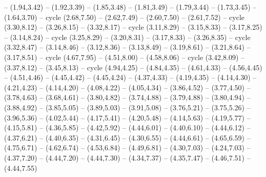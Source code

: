{-- (1.94,3.42) -- (1.92,3.39) -- (1.85,3.48) -- (1.81,3.49) -- (1.79,3.44) -- (1.73,3.45) -- (1.64,3.70) -- cycle
  (2.68,7.50) -- (2.62,7.49) -- (2.60,7.50) -- (2.61,7.52) -- cycle
  (3.30,8.12) -- (3.26,8.15) -- (3.32,8.17) -- cycle
  (3.11,8.29) -- (3.15,8.33) -- (3.17,8.25) -- (3.14,8.24) -- cycle
  (3.25,8.29) -- (3.20,8.31) -- (3.17,8.33) -- (3.26,8.35) -- cycle
  (3.32,8.47) -- (3.14,8.46) -- (3.12,8.36) -- (3.13,8.49) -- (3.19,8.61) -- (3.21,8.64) -- (3.17,8.51) -- cycle
  (4.67,7.95) -- (4.51,8.00) -- (4.58,8.06) -- cycle
  (3.42,8.09) -- (3.37,8.12) -- (3.45,8.13) -- cycle}
\expandafter\def\csname geo:Heute:Grenze\endcsname{
  (4.94,4.25) -- (4.84,4.35) -- (4.61,4.33) -- (4.56,4.45) -- (4.51,4.46) -- (4.45,4.42) -- (4.45,4.24) -- (4.37,4.33) -- (4.19,4.35) -- (4.14,4.30) -- (4.21,4.23) -- (4.14,4.20) -- (4.08,4.22) -- (4.05,4.34) -- (3.86,4.52) -- (3.77,4.50) -- (3.78,4.63) -- (3.68,4.61) -- (3.80,4.82) -- (3.74,4.88) -- (3.79,4.88) -- (3.80,4.94) -- (3.88,4.92) -- (3.85,5.05) -- (3.89,5.03) -- (3.91,5.08) -- (3.76,5.21) -- (3.75,5.26) -- (3.96,5.36) -- (4.02,5.44) -- (4.17,5.41) -- (4.20,5.48) -- (4.14,5.63) -- (4.19,5.77) -- (4.15,5.81) -- (4.36,5.85) -- (4.42,5.92) -- (4.44,6.01) -- (4.40,6.10) -- (4.44,6.12) -- (4.37,6.21) -- (4.40,6.35) -- (4.31,6.45) -- (4.30,6.55) -- (4.44,6.61) -- (4.65,6.59) -- (4.75,6.71) -- (4.62,6.74) -- (4.53,6.84) -- (4.49,6.81) -- (4.30,7.03) -- (4.24,7.03) -- (4.37,7.20) -- (4.44,7.20) -- (4.44,7.30) -- (4.34,7.37) -- (4.35,7.47) -- (4.46,7.51) -- (4.44,7.55)}

